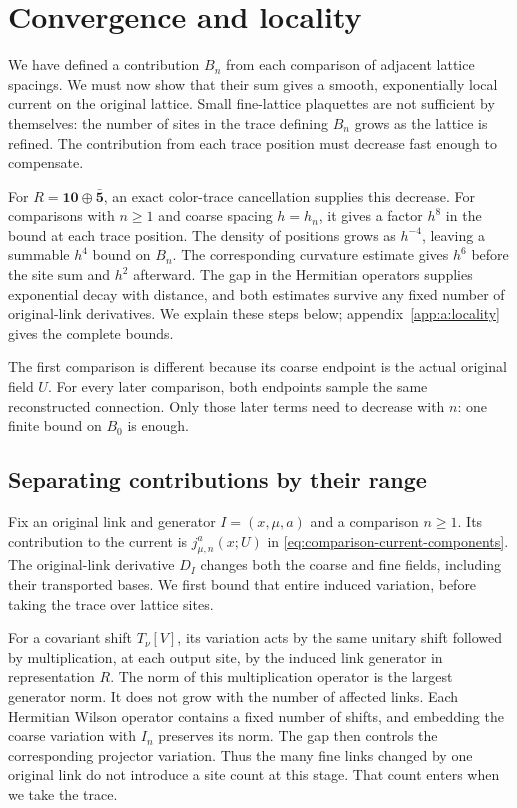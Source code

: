 \documentclass[11pt,a4paper]{article}
\theoremstyle{remark}
\begin{document}
\section{Convergence and locality}
\label{sec:locality}

We have defined a contribution $B_n$ from each comparison of adjacent
lattice spacings. We must now show that their sum gives a smooth,
exponentially local current on the original lattice. Small fine-lattice
plaquettes are not sufficient by themselves: the number of sites in
the trace defining $B_n$ grows as the lattice is refined. The contribution
from each trace position must decrease fast enough to compensate.

For $R=\mathbf{10}\oplus\bar{\mathbf5}$, an exact color-trace
cancellation supplies this decrease. For comparisons with $n\ge1$
and coarse spacing $h=h_n$, it
gives a factor $h^8$ in the bound at each trace position. The density of
positions grows as $h^{-4}$, leaving a summable $h^4$ bound on $B_n$.
The corresponding curvature estimate gives $h^6$ before the site sum
and $h^2$ afterward. The gap in the Hermitian operators supplies
exponential decay with distance, and both estimates survive any fixed
number of original-link derivatives. We explain these steps below;
appendix~\ref{app:a:locality} gives the complete bounds.

The first comparison is different because its coarse endpoint is the
actual original field $U$. For every later comparison, both endpoints
sample the same reconstructed connection. Only those later terms need
to decrease with $n$: one finite bound on $B_0$ is enough.

\subsection{Separating contributions by their range}

Fix an original link and generator $I=(x,\mu,a)$ and a comparison
$n\ge1$. Its contribution to the current is
$j_{\mu,n}^a(x;U)$ in \eqref{eq:comparison-current-components}.
The original-link derivative $D_I$ changes both the coarse and fine
fields, including their transported bases. We first bound that entire
induced variation, before taking the trace over lattice sites.

For a covariant shift $T_\nu[V]$, its variation acts by the same unitary
shift followed by multiplication, at each output site, by the induced
link generator in representation $R$. The norm of this multiplication
operator is the largest generator norm. It does not grow with the number
of affected links. Each Hermitian Wilson operator contains a fixed number
of shifts, and embedding the coarse variation with $I_n$ preserves its
norm. The gap then controls the corresponding projector variation. Thus
the many fine links changed by one original link do not introduce a site
count at this stage. That count enters when we take the trace.
\end{document}
